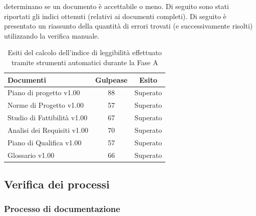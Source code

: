 				determinano se un documento è accettabile o meno. Di seguito sono stati riportati gli indici ottenuti (relativi ai documenti completi).
				Di seguito è presentato un riassunto della quantità di errori trovati (e successivamente risolti) utilizzando la verifica manuale.
				\begin{table}[H]
					\centering
					\begin{tabu}{| l | c | c |}
							\hline
							Documenti 							& Gulpease	& Esito  \\ \hline \hline
							
							Piano di progetto v1.00				& 88 		& Superato \\ \hline
							Norme di Progetto v1.00 			& 57		& Superato 		 \\ \hline
							Studio di Fattibilità v1.00 		& 67		& Superato 		 \\ \hline
							Analisi dei Requisiti v1.00	 		& 70		& Superato 		 \\ \hline
							Piano di Qualifica v1.00 			& 57		& Superato 	 \\ \hline
							Glossario v1.00					 	& 66 		& Superato	\\ \hline
						\end{tabu}
					\caption{Esiti del calcolo dell'indice di leggibilità effettuato tramite strumenti automatici durante la Fase A}
				\end{table}
	\subsection{Verifica dei processi}
		\subsubsection{Processo di documentazione}
